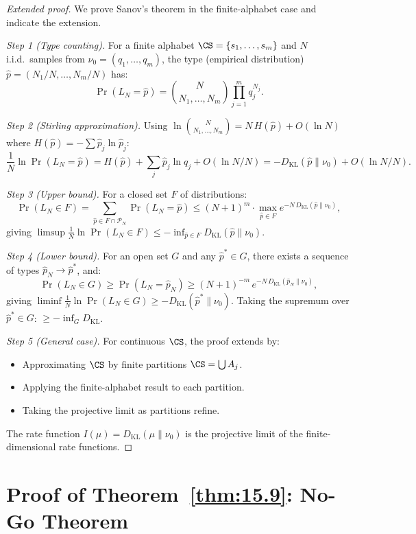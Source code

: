 \begin{proof}[Extended proof]
We prove Sanov's theorem in the finite-alphabet case and indicate the
extension.

\emph{Step 1 (Type counting).}
For a finite alphabet $\CS = \{s_1, \ldots, s_m\}$ and $N$ i.i.d.\
samples from $\nu_0 = (q_1, \ldots, q_m)$, the type (empirical
distribution) $\hat{p} = (N_1/N, \ldots, N_m/N)$ has:
\[
  \Pr(L_N = \hat{p})
  = \binom{N}{N_1, \ldots, N_m} \prod_{j=1}^m q_j^{N_j}.
\]

\emph{Step 2 (Stirling approximation).}
Using $\ln\binom{N}{N_1,\ldots,N_m} = N\,H(\hat{p}) + O(\ln N)$
where $H(\hat{p}) = -\sum \hat{p}_j\ln\hat{p}_j$:
\[
  \frac{1}{N}\ln\Pr(L_N = \hat{p})
  = H(\hat{p}) + \sum_j \hat{p}_j\ln q_j + O(\ln N / N)
  = -D_{\mathrm{KL}}(\hat{p}\|\nu_0) + O(\ln N / N).
\]

\emph{Step 3 (Upper bound).}
For a closed set $F$ of distributions:
\[
  \Pr(L_N \in F) = \sum_{\hat{p} \in F \cap \mathcal{P}_N}
  \Pr(L_N = \hat{p})
  \leq (N+1)^m \cdot \max_{\hat{p} \in F} e^{-N\,D_{\mathrm{KL}}(\hat{p}\|\nu_0)},
\]
giving $\limsup \frac{1}{N}\ln\Pr(L_N \in F) \leq
-\inf_{\hat{p} \in F} D_{\mathrm{KL}}(\hat{p}\|\nu_0)$.

\emph{Step 4 (Lower bound).}
For an open set $G$ and any $\hat{p}^* \in G$, there exists a sequence
of types $\hat{p}_N \to \hat{p}^*$, and:
\[
  \Pr(L_N \in G) \geq \Pr(L_N = \hat{p}_N)
  \geq (N+1)^{-m}\,e^{-N\,D_{\mathrm{KL}}(\hat{p}_N\|\nu_0)},
\]
giving $\liminf \frac{1}{N}\ln\Pr(L_N \in G) \geq
-D_{\mathrm{KL}}(\hat{p}^*\|\nu_0)$.  Taking the supremum over
$\hat{p}^* \in G$: $\geq -\inf_G D_{\mathrm{KL}}$.

\emph{Step 5 (General case).}
For continuous $\CS$, the proof extends by:
\begin{itemize}
  \item Approximating $\CS$ by finite partitions $\CS = \bigcup A_j$.
  \item Applying the finite-alphabet result to each partition.
  \item Taking the projective limit as partitions refine.
\end{itemize}
The rate function $I(\mu) = D_{\mathrm{KL}}(\mu\|\nu_0)$ is the
projective limit of the finite-dimensional rate functions.
\end{proof}

\section{Proof of Theorem~\ref{thm:15.9}: No-Go Theorem}
\label{app:pf-nogo}

